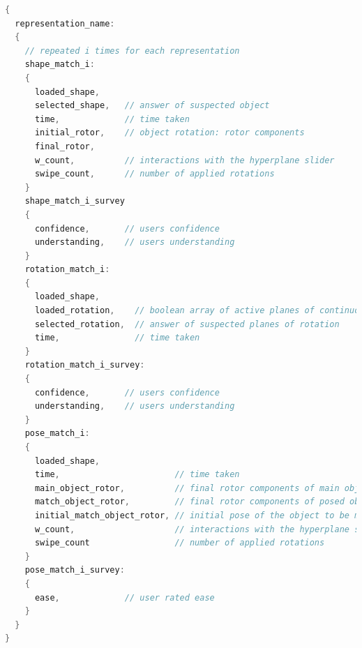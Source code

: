 \documentclass{l4proj}
\begin{document}
\begin{appendices}
\begin{lstlisting}[language=java, float, caption={
  JSON schema for data collection
}, label=lst:json]
{
  representation_name:
  {
    // repeated i times for each representation
    shape_match_i: 
    {
      loaded_shape,
      selected_shape,   // answer of suspected object
      time,             // time taken
      initial_rotor,    // object rotation: rotor components
      final_rotor,
      w_count,          // interactions with the hyperplane slider
      swipe_count,      // number of applied rotations
    }
    shape_match_i_survey
    {
      confidence,       // users confidence
      understanding,    // users understanding
    }
    rotation_match_i:
    {
      loaded_shape,
      loaded_rotation,    // boolean array of active planes of continuous rotation
      selected_rotation,  // answer of suspected planes of rotation
      time,               // time taken
    }
    rotation_match_i_survey:
    {
      confidence,       // users confidence
      understanding,    // users understanding
    }
    pose_match_i:
    {
      loaded_shape,
      time,                       // time taken
      main_object_rotor,          // final rotor components of main object
      match_object_rotor,         // final rotor components of posed object to be matched
      initial_match_object_rotor, // initial pose of the object to be matched
      w_count,                    // interactions with the hyperplane slider
      swipe_count                 // number of applied rotations
    }
    pose_match_i_survey:
    {
      ease,             // user rated ease
    }
  }
}
\end{lstlisting}

\pagebreak

\label{questionnaire}


\end{appendices}






\end{document}

